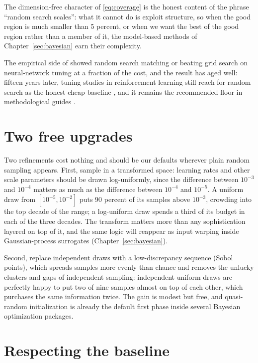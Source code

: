 The dimension-free character of
\eqref{eq:coverage} is the honest content of the phrase ``random search
scales'': what it cannot do is exploit structure, so when the good region
is much smaller than 5 percent, or when we want the best of the good region
rather than a member of it, the model-based methods of
Chapter~\ref{sec:bayesian} earn their complexity.

The empirical side of
\citet{bergstra2012random} showed random search matching or beating grid
search on neural-network tuning at a fraction of the cost, and the result
has aged well: fifteen years later, tuning studies in reinforcement
learning still reach for random search as the honest cheap baseline
\citep{eimer2023hyperparameters}, and it remains the recommended floor in
methodological guides \citep{bischl2023hyperparameter}.

\section{Two free upgrades}

Two refinements cost nothing and should be our defaults wherever
plain random sampling appears. First, sample in a transformed space:
learning rates and other scale parameters should be drawn log-uniformly, since
the difference between $10^{-3}$ and $10^{-4}$ matters as much as the
difference between $10^{-4}$ and $10^{-5}$. A uniform draw from
$[10^{-5}, 10^{-2}]$ puts 90 percent of its samples above $10^{-3}$,
crowding into the top decade of the range; a log-uniform draw spends a
third of its budget in each of the three decades. The transform matters
more than any sophistication layered on top of it, and the same logic will
reappear as input warping inside Gaussian-process surrogates
(Chapter~\ref{sec:bayesian}).

Second, replace independent draws with a low-discrepancy sequence (Sobol
points), which spreads samples more evenly than chance and removes the
unlucky clusters and gaps of independent sampling: independent uniform draws
are perfectly happy to put two of nine samples almost on top of each other,
which purchases the same information twice. The gain is modest but free, and
quasi-random initialization is already the default first phase inside
several Bayesian optimization packages.

\section{Respecting the baseline}

